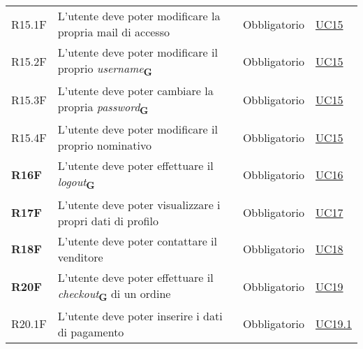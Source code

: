 \begin{center}
\begin{longtable}[!h]{p{50px} p{245px} p{75px} p{50px}}
        R15.1F                                & L'utente deve poter modificare la propria mail di accesso                                                                          & Obbligatorio             & \hyperref[sec:UC15]{UC15}                    \\
        R15.2F                                & L'utente deve poter modificare il proprio \textit{username}\textsubscript{\textbf{G}}                                              & Obbligatorio             & \hyperref[sec:UC15]{UC15}                    \\
        R15.3F                                & L'utente deve poter cambiare la propria \textit{password}\textsubscript{\textbf{G}}                                                & Obbligatorio             & \hyperref[sec:UC15]{UC15}                    \\
        R15.4F                                & L'utente deve poter modificare il proprio nominativo                                                                               & Obbligatorio             & \hyperref[sec:UC15]{UC15}                    \\
        \textbf{R16F}                         & L'utente deve poter effettuare il \textit{logout}\textsubscript{\textbf{G}}                                                        & Obbligatorio             & \hyperref[sec:UC16]{UC16}                    \\
        \textbf{R17F}                         & L'utente deve poter visualizzare i propri dati di profilo                                                                          & Obbligatorio             & \hyperref[sec:UC17]{UC17}                    \\
        \textbf{R18F}                         & L'utente deve poter contattare il venditore                                                                                        & Obbligatorio             & \hyperref[sec:UC18]{UC18}                    \\
        \textbf{R20F}                         & L'utente deve poter effettuare il \textit{checkout}\textsubscript{\textbf{G}} di un ordine                                         & Obbligatorio             & \hyperref[sec:UC19]{UC19}                    \\
        R20.1F                                & L'utente deve poter inserire i dati di pagamento                                                                                   & Obbligatorio             & \hyperref[sec:UC19.1]{UC19.1}                \\

\end{longtable}
\end{center}
